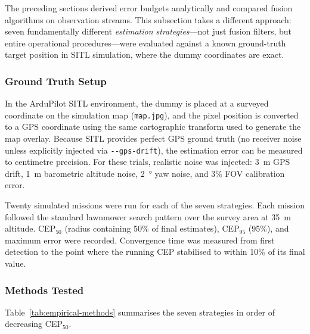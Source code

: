 The preceding sections derived error budgets analytically and compared fusion algorithms on observation streams.  This subsection takes a different approach: seven fundamentally different \emph{estimation strategies}---not just fusion filters, but entire operational procedures---were evaluated against a known ground-truth target position in SITL simulation, where the dummy coordinates are exact.

\subsubsection{Ground Truth Setup}

In the ArduPilot SITL environment, the dummy is placed at a surveyed coordinate on the simulation map (\texttt{map.jpg}), and the pixel position is converted to a GPS coordinate using the same cartographic transform used to generate the map overlay.  Because SITL provides perfect GPS ground truth (no receiver noise unless explicitly injected via \texttt{-{}-gps-drift}), the estimation error can be measured to centimetre precision.  For these trials, realistic noise was injected: \SI{3}{\metre} GPS drift, \SI{1}{\metre} barometric altitude noise, \SI{2}{\degree} yaw noise, and 3\% FOV calibration error.

Twenty simulated missions were run for each of the seven strategies.  Each mission followed the standard lawnmower search pattern over the survey area at \SI{35}{\metre} altitude.  CEP$_{50}$ (radius containing 50\% of final estimates), CEP$_{95}$ (95\%), and maximum error were recorded.  Convergence time was measured from first detection to the point where the running CEP stabilised to within 10\% of its final value.

\subsubsection{Methods Tested}

Table~\ref{tab:empirical-methods} summarises the seven strategies in order of decreasing CEP$_{50}$.

